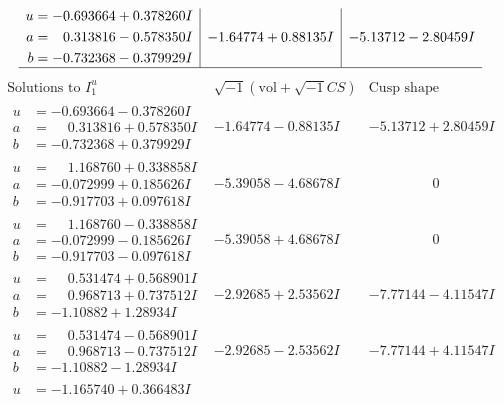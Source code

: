 \documentclass[1p]{elsarticle_modified}
\theoremstyle{definition}
\newcommand{\I}{\sqrt{-1}}
\begin{document}
$$\begin{array}{c|c|c}
\begin{aligned}
u &= -0.693664 + 0.378260 I \\
a &= \phantom{-}0.313816 - 0.578350 I \\
b &= -0.732368 - 0.379929 I\end{aligned}
 & -1.64774 + 0.88135 I & -5.13712 - 2.80459 I\\
 \hline 
 \end{array}$$\newpage$$\begin{array}{c|c|c}  
\text{Solutions to }I^u_{1}& \I (\text{vol} + \sqrt{-1}CS) & \text{Cusp shape}\\
 \hline 
\begin{aligned}
u &= -0.693664 - 0.378260 I \\
a &= \phantom{-}0.313816 + 0.578350 I \\
b &= -0.732368 + 0.379929 I\end{aligned}
 & -1.64774 - 0.88135 I & -5.13712 + 2.80459 I \\ \hline\begin{aligned}
u &= \phantom{-}1.168760 + 0.338858 I \\
a &= -0.072999 + 0.185626 I \\
b &= -0.917703 + 0.097618 I\end{aligned}
 & -5.39058 - 4.68678 I & \phantom{-0.000000 } 0 \\ \hline\begin{aligned}
u &= \phantom{-}1.168760 - 0.338858 I \\
a &= -0.072999 - 0.185626 I \\
b &= -0.917703 - 0.097618 I\end{aligned}
 & -5.39058 + 4.68678 I & \phantom{-0.000000 } 0 \\ \hline\begin{aligned}
u &= \phantom{-}0.531474 + 0.568901 I \\
a &= \phantom{-}0.968713 + 0.737512 I \\
b &= -1.10882 + 1.28934 I\end{aligned}
 & -2.92685 + 2.53562 I & -7.77144 - 4.11547 I \\ \hline\begin{aligned}
u &= \phantom{-}0.531474 - 0.568901 I \\
a &= \phantom{-}0.968713 - 0.737512 I \\
b &= -1.10882 - 1.28934 I\end{aligned}
 & -2.92685 - 2.53562 I & -7.77144 + 4.11547 I \\ \hline\begin{aligned}
u &= -1.165740 + 0.366483 I \\

\end{aligned}
\end{array}$$
\end{document}
